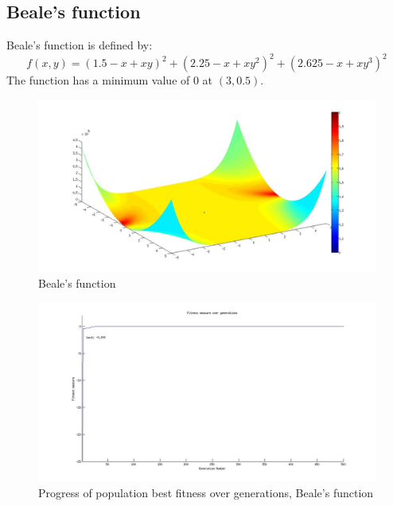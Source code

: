 \documentclass[a4paper]{article}
\begin{document}
\clearpage

\subsection{Beale's function}

Beale's function is defined by:
\begin{equation}
f(x,y) = (1.5-x+xy)^2+(2.25-x+xy^2)^2+(2.625-x+xy^3)^2
\end{equation}
The function has a minimum value of 0 at $(3,0.5)$.

\begin{figure}[hb!]
\centering
\includegraphics[width=\textwidth]{Beale.jpg}
\caption{Beale's function}
\label{B1}
\end{figure}

\begin{figure}[hb!]
\centering
\includegraphics[width=\textwidth]{Beale_fitness_vs_generation.jpg}
\caption{Progress of population best fitness over generations, Beale's function}
\label{B1F}
\end{figure}
\end{document}

